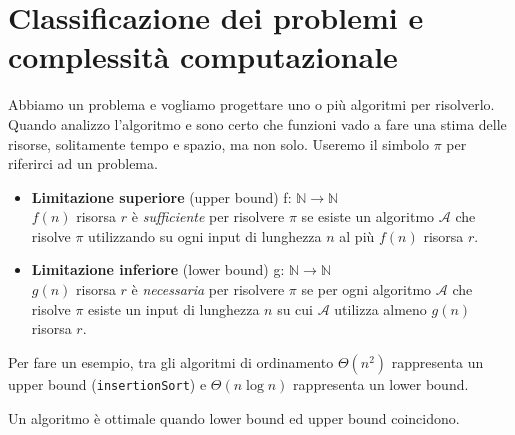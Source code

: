 \section[Complessità Computazionale]{Classificazione dei problemi e complessità computazionale}
Abbiamo un problema e vogliamo progettare uno o più algoritmi per risolverlo.
Quando analizzo l'algoritmo e sono certo che funzioni vado a fare una stima delle risorse, solitamente tempo
e spazio, ma non solo.
Useremo il simbolo $\pi$ per riferirci ad un problema.\\
\begin{itemize}
\item \textbf{Limitazione superiore} (upper bound) f: $\mathbb{N} \rightarrow \mathbb{N}$\\
$f(n)$ risorsa $r$ è \emph{sufficiente} per risolvere $\pi$ se esiste un algoritmo $\mathcal{A}$
che risolve $\pi$ utilizzando su ogni input di lunghezza $n$ al più $f(n)$ risorsa $r$.\\
\item \textbf{Limitazione inferiore} (lower bound) g: $\mathbb{N} \rightarrow \mathbb{N}$\\
$g(n)$ risorsa $r$ è \emph{necessaria} per risolvere $\pi$ se per ogni algoritmo $\mathcal{A}$ che 
risolve $\pi$ esiste un input di lunghezza $n$ su cui $\mathcal{A}$ utilizza almeno $g(n)$ risorsa $r$.\\
\end{itemize}
\noindent Per fare un esempio, tra gli algoritmi di ordinamento $\Theta(n^2)$ rappresenta un upper bound (\texttt{insertionSort})
e $\Theta(n \log n)$ rappresenta un lower bound.


Un algoritmo è ottimale quando lower bound ed upper bound coincidono.
